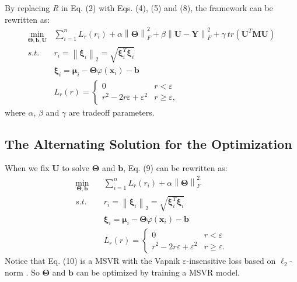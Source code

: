\documentclass[conference]{IEEEtran}
\begin{document}
By replacing \emph{R} in Eq. (2) with Eqs. (4), (5) and (8), the framework can be rewritten as:
\begin{equation}
\begin{split}
\mathop {\min }\limits_{\bm{\Theta}, \bm{b}, \bm{U}}&\sum_{i=1}^nL_r(r_i) + \alpha\left\lVert \bm{\Theta} \right\rVert_F^2 + \beta \left\lVert \bm{U} - \bm{Y} \right\rVert_F^2 + \gamma \ tr(\bm{U}^T\bm{M}\bm{U})\\
s.t.\quad&r_i=\left\lVert \bm{\xi}_i \right\rVert_2=\sqrt{\bm{\xi}_i^T\bm{\xi}_i}\\
&\bm{\xi}_i=\bm{\mu}_i-\bm{\Theta}\varphi(\bm{x}_i)-\bm{b}\\
&L_r(r)=
\left\{
     \begin{array}{lr}
     0 &r<\varepsilon\\
     r^2-2r\varepsilon+\varepsilon^2 &r \geq \varepsilon,
     \end{array}
\right.
\end{split}
\end{equation}
where $\alpha$, $\beta$ and $\gamma$ are tradeoff parameters.

\subsection{The Alternating Solution for the Optimization}
When we fix $\bm{U}$ to solve $\bm{\Theta}$ and $\bm{b}$, Eq. (9) can be rewritten as:
\begin{equation}
\begin{split}
\mathop {\min }\limits_{\bm{\Theta}, \bm{b}}\quad&\sum_{i=1}^nL_r(r_i) + \alpha\left\lVert \bm{\Theta} \right\rVert_F^2\\
s.t.\quad&r_i=\left\lVert \bm{\xi}_i \right\rVert_2=\sqrt{\bm{\xi}_i^T\bm{\xi}_i}\\
&\bm{\xi}_i=\bm{\mu}_i-\bm{\Theta}\varphi(\bm{x}_i)-\bm{b}\\
&L_r(r)=
\left\{
     \begin{array}{lr}
     0&r<\varepsilon\\
     r^2-2r\varepsilon+\varepsilon^2 &r \geq \varepsilon.
     \end{array}
\right.
\end{split}
\end{equation}
Notice that Eq. (10) is a MSVR with the Vapnik $\varepsilon$-insensitive loss based on $\ell_2$-norm \cite{tuia2011multioutput}. So $\bm{\Theta}$ and $\bm{b}$ can be optimized by training a MSVR model.
\end{document}
